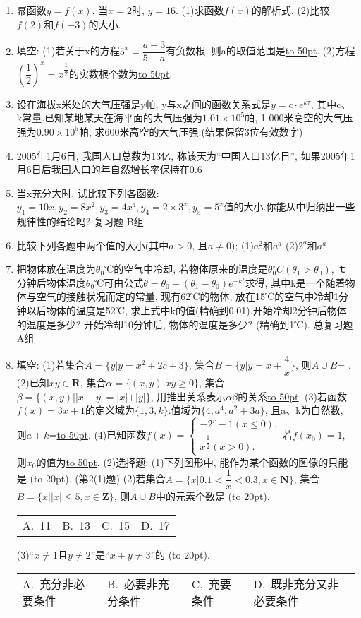 \documentclass[10pt,a4paper]{article}
\newcommand{\blank}[1]{\underline{\hbox to #1pt{}}}
\newcommand{\bracket}[1]{(\hbox to #1pt{})}
\newcommand{\fourch}[4]{\par\begin{tabular}{p{.23\textwidth}p{.23\textwidth}p{.23\textwidth}p{.23\textwidth}}
A.~#1 &B.~#2& C.~#3& D.~#4
\end{tabular}}
\begin{document}
\begin{enumerate}[1.]
\fourch{$[0,+\infty)$}{$(1,+\infty)$}{$(0,1)$}{$(0,1]$}
复习题
A组
\item 幂函数$y=f(x)$, 当$x=2$时, $y=16$.
(1)求函数$f(x)$的解析式.
(2)比较$f(2)$和$f(-3)$的大小.
\item 填空:
(1)若关于x的方程$5^x=\dfrac{a+3}{5-a}$有负数根, 则a的取值范围是\blank{50}.
(2)方程$(\dfrac 12)^x=x^{\dfrac 12}$的实数根个数为\blank{50}.
\item 设在海拔x米处的大气压强是y帕, y与x之间的函数关系式是$y=c\cdot e^{k\tau }$, 其中c、k常量.已知某地某天在海平面的大气压强为$1.01\times 10^5$帕, 1 000米高空的大气压强为$0.90\times 10^5$帕, 求600米高空的大气压强.(结果保留3位有效数字)
\item 2005年1月6日, 我国人口总数为13亿, 称该天为``中国人口13亿日'', 如果2005年1月6日后我国人口的年自然增长率保持在0.6%
\item 当x充分大时, 试比较下列各函数: $y_1=10x,y_2=8x^2,y_3=4x^4,y_4=2\times 3^x,y_5=5^x$值的大小.你能从中归纳出一些规律性的结论吗?
复习题
B组
\item 比较下列各题中两个值的大小(其中$a>0$, 且$a\ne 0$);
(1)$a^2$和$a^a$							(2)$2^a$和$a^a$
\item 把物体放在温度为$\theta _0$℃的空气中冷却, 若物体原来的温度是$\theta _0^\circ C(\theta _1>\theta _0)$, ｔ分钟后物体温度$\theta _0$℃可由公式$\theta =\theta _0+(\theta _1-\theta _0)e^{-kt}$求得, 其中k是一个随着物体与空气的接触状况而定的常量, 现有62℃的物体, 放在15℃的空气中冷却1分钟以后物体的温度是52℃, 求上式中k的值(精确到0.01).开始冷却2分钟后物体的温度是多少? 开始冷却10分钟后, 物体的温度是多少? (精确到1℃).
总复习题
A组
\item 填空:
(1)若集合$A=\{y|y=x^2+2c+3\}$, 集合$B=\{y|y=x+\dfrac 4x\}$, 则$A\cup B$=		.
(2)已知$xy\in \mathbf{R}$, 集合$\alpha =\{(x,y)|xy\ge 0\}$, 集合$\beta =\{(x,y)||x+y|=|x|+|y|\}$, 用推出关系表示$\alpha \beta$的关系\blank{50}.
(3)若函数$f(x)=3x+1$的定义域为$\{1,3,k\}$.值域为$\{4,a^4,a^2+3a\}$, 且a、k为自然数, 则$a+k$=\blank{50}.
(4)已知函数$f(x)=\begin{cases} -2^r-1(x\le 0), \\ x^{\dfrac 12}(x>0). \end{cases}$若$f(x_0)=1$, 则$x_0$的值为\blank{50}.
(2)选择题:
(1)下列图形中, 能作为某个函数的图像的只能是						\bracket{20}.
(第2(1)题)
(2)若集合$A=\{x|0.1<\dfrac 1x<0.3,x\in \mathbf{N}\}$, 集合$B=\{x||x|\le 5,x\in \mathbf{Z}\}$, 则$A\cup B$中的元素个数是															\bracket{20}.
\fourch{11}{13}{15}{17}
(3)``$x\ne 1$且$y\ne 2$''是``$x+y\ne 3$''的								\bracket{20}.
\fourch{充分非必要条件}{必要非充分条件}{充要条件}{既非充分又非必要条件}

\end{enumerate}
\end{document}
